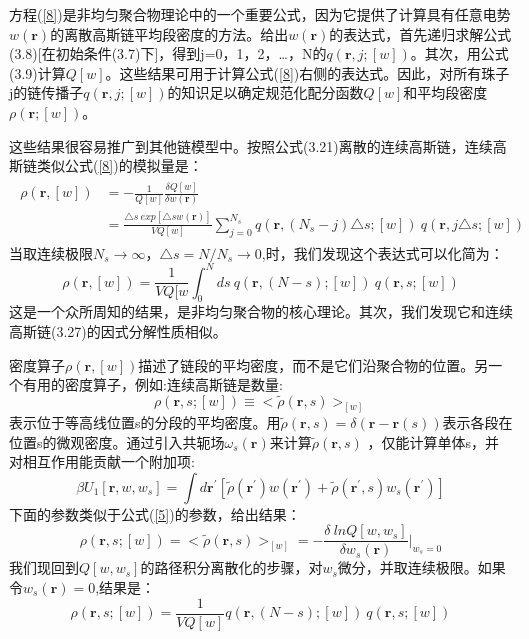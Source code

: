 方程(\ref{8})是非均匀聚合物理论中的一个重要公式，因为它提供了计算具有任意电势$w(\mathbf{r})$的离散高斯链平均段密度的方法。给出$w(\mathbf{r})$的表达式，首先递归求解公式(3.8)[在初始条件(3.7)下]，得到j=0，1，2，…，N的$q(\mathbf{r},j;[w])$。其次，用公式(3.9)计算$Q[w]$。这些结果可用于计算公式(\ref{8})右侧的表达式。因此，对所有珠子j的链传播子$q(\mathbf{r},j;[w])$的知识足以确定规范化配分函数$Q[w]$和平均段密度$\rho(\mathbf{r};[w])$。

这些结果很容易推广到其他链模型中。按照公式(3.21)离散的连续高斯链，连续高斯链类似公式(\ref{8})的模拟量是：
\begin{align}\label{9}
\begin{split}
\rho(\mathbf{r},[w])&=-\frac{1}{Q[w]}\frac{\delta Q[w]}{\delta w(\mathbf{r})}\\ &=\frac{\triangle s ~exp[\triangle sw(\mathbf{r})]}{VQ[w]}\sum_{j=0}^{N_s}q(\mathbf{r},(N_s-j)\triangle s;[w])~q(\mathbf{r},j\triangle s;[w])
\end{split}
\end{align}
当取连续极限$N_s\to \infty$，$\triangle s=N/N_s\to 0$,时，我们发现这个表达式可以化简为：
\begin{equation}\label{10}
\rho(\mathbf{r},[w])=\frac{1}{VQ[w}\int_{0}^{N}ds~q(\mathbf{r},(N-s);[w])~q(\mathbf{r},s;[w])
\end{equation}
这是一个众所周知的结果，是非均匀聚合物的核心理论。其次，我们发现它和连续高斯链(3.27)的因式分解性质相似。

密度算子$\rho(\mathbf{r},[w])$描述了链段的平均密度，而不是它们沿聚合物的位置。另一个有用的密度算子，例如:连续高斯链是数量:
\begin{equation}\label{11}
\rho(\mathbf{r},s;[w])\equiv <\tilde{\rho}(\mathbf{r},s)>_{[w]}
\end{equation}
表示位于等高线位置s的分段的平均密度。用$\tilde{\rho}(\mathbf{r},s)=\delta(\mathbf{r}-\mathbf{r}(s))$表示各段在位置s的微观密度。通过引入共轭场$\omega_s(\mathbf{r})$来计算$\tilde{\rho}(\mathbf{r},s)$
，仅能计算单体s，并对相互作用能贡献一个附加项:
\begin{equation}\label{12}
\beta U_1[\mathbf{r},w ,w_s]=\int d\mathbf{r}^{'}[\tilde{\rho}(\mathbf{r}^{'})w (\mathbf{r}^{'})+\tilde{\rho}(\mathbf{r}^{'},s)w_s(\mathbf{r}^{'})]
\end{equation}
下面的参数类似于公式(\ref{5})的参数，给出结果：
\begin{equation}\label{13}
\rho(\mathbf{r},s;[w])=<\tilde{\rho}(\mathbf{r},s)>_{[w]}
=-\frac{\delta~lnQ[w,w_s]}{\delta w_s(\mathbf{r})} \bigg |_{w_s=0}
\end{equation}
我们现回到$Q[w,w_s]$的路径积分离散化的步骤，对$w_s$微分，并取连续极限。如果令$w_s(\mathbf{r})=0$,结果是：
\begin{equation}\label{14}
\rho(\mathbf{r},s;[w])=\frac{1}{VQ[w]}q(\mathbf{r},(N-s);[w])~q(\mathbf{r},s;[w])
\end{equation}

